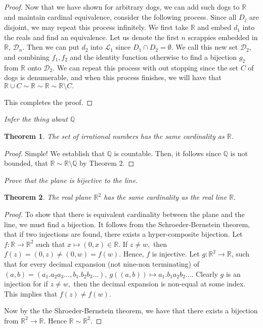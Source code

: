 \documentclass[letter]{article}
\newtheorem{theorem}{Theorem}
\newenvironment{menumerate}{%
  \edef\backupindent{\the\parindent}%
  \enumerate%
  \setlength{\parindent}{\backupindent}%
}{\endenumerate}
\begin{document}
\begin{menumerate}
\begin{menumerate}
\begin{proof}
					  Now that we have shown for arbitrary dogs, we can add such dogs to $\mathbb{R}$ and maintain cardinal equivalence, consider the following process. Since all $D_j$ are disjoint, we may repeat this process infinitely. We first take $\mathbb{R}$ and embed $d_1$ into the reals and find an equivalence. Let us denote the first $n$ scrappies embedded in $\mathbb{R}$, $\mathcal{D}_n$. Then we can put $d_2$ into $\mathcal{L}_1$ since $D_1 \cap D_2 = \emptyset$. We call this new set $\mathcal{D}_2$, and combining $f_1,f_2$ and the identity function otherwise to find a bijection $g_2$ from $\mathbb{R}$ onto $\mathcal{D}_2.$ We can repeat this process with out stopping since the set $C$ of dogs is denumerable, and when this process finishes, we will have that $\mathbb{R} \cup C \sim \mathbb{R} \sim \mathbb{R} \sim \mathbb{R} \setminus C.$

					  This completes the proof. 
 
	 		  \end{proof}

	 		  \item \textit{Infer the thing about $\mathbb{Q}$ } 
	 		  	\begin{theorem}
	 		  		The set of irrational numbers has the same cardinality as $\mathbb{R}.$
	 		  	\end{theorem}
	 		  	\begin{proof}
	 		  	Simple! We establish that $\mathbb{Q}$ is countable. Then, it follows since $\mathbb{Q}$ is not bounded, that $\mathbb{R} \sim \mathbb{R} \setminus \mathbb{Q}$ by Theorem 2.
	 		  	\end{proof}
		 \end{menumerate} 
		 \item \textit{Prove that the plane is bijective to the line.}
		 	\begin{theorem}
		 		The real plane $\mathbb{R}^2$ has the same cardinality as the real line $\mathbb{R}.$
		 	\end{theorem}
		 	\begin{proof}
		 		To show that there is equivalent cardinality between the plane and the line, we must find a bijection. It follows from the Schroeder-Bernstein theorem, that if two injections are found, there exists a hyper-composite bijection. Let $f: \mathbb{R} \to \mathbb{R}^2$ such that $x \mapsto (0, x) \in \mathbb{R}.$ If $z\neq w,$ then $f(z) = (0,z) \neq (0,w) = f(w).$ Hence, $f$ is injective. Let $g:\mathbb{R}^2 \to \mathbb{R}$, such that for every decimal expansion (not nine-non terminating) of $(a,b) = (a_1.a_2a_3\dots,b_1.b_2b_3\dots),\  g\left((a,b)\right) \mapsto a_1.b_1a_2b_2\dots.$ Clearly $g$ is an injection for if $z \neq w,$ then the decimal expansion is non-equal at some index. This implies that $f(z) \neq f(w)$.

		 		Now by the the Shroeder-Bernstein theorem, we have that there exists a bijection from $\mathbb{R}^2 \to \mathbb{R}.$ Hence $\mathbb{R} \sim \mathbb{R}^2.$
		 	\end{proof}

\end{menumerate}
\end{document}
